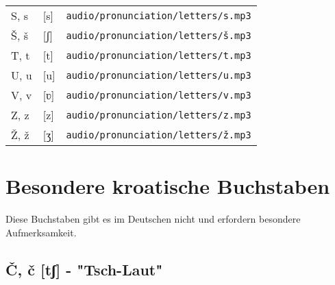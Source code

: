 \begin{center}
\begin{tabular}{lll}
S, s & [s] & \small\texttt{audio/pronunciation/letters/s.mp3} \\
Š, š & [ʃ] & \small\texttt{audio/pronunciation/letters/š.mp3} \\
T, t & [t] & \small\texttt{audio/pronunciation/letters/t.mp3} \\
U, u & [u] & \small\texttt{audio/pronunciation/letters/u.mp3} \\
V, v & [ʋ] & \small\texttt{audio/pronunciation/letters/v.mp3} \\
Z, z & [z] & \small\texttt{audio/pronunciation/letters/z.mp3} \\
Ž, ž & [ʒ] & \small\texttt{audio/pronunciation/letters/ž.mp3} \\
\bottomrule
\end{tabular}
\end{center}

\section{Besondere kroatische Buchstaben}

Diese Buchstaben gibt es im Deutschen nicht und erfordern besondere Aufmerksamkeit.

\subsection{Č, č [tʃ] - "Tsch-Laut"}

